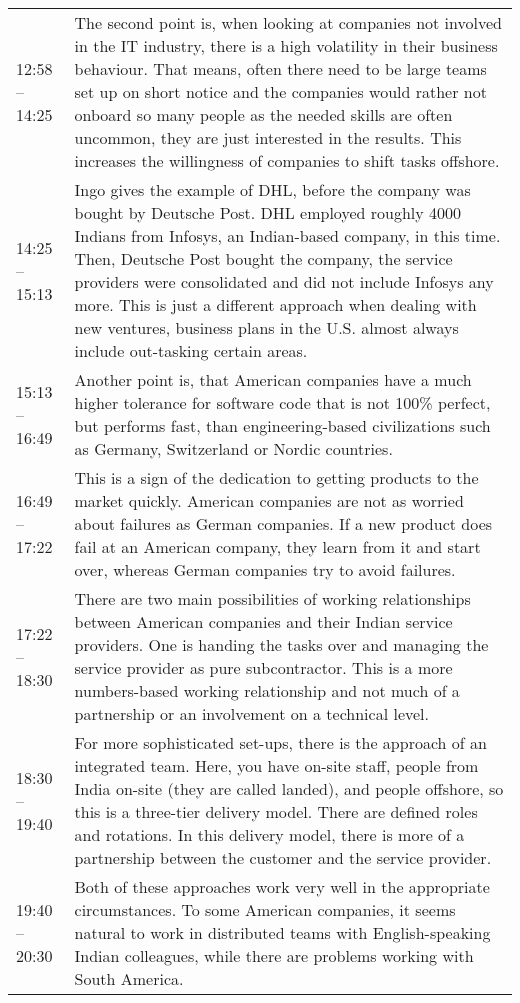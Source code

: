 \begin{appendix}
\begin{longtable}{l p{12.5cm}}
	12:58 -- 14:25& The second point is, when looking at companies not involved in the IT industry, there is a high volatility in their business behaviour. That means, often there need to be large teams set up on short notice and the companies would rather not onboard so many people as the needed skills are often uncommon, they are just interested in the results. This increases the willingness of companies to shift tasks offshore.\\
	14:25 -- 15:13&Ingo gives the example of DHL, before the company was bought by Deutsche Post. DHL employed roughly 4000 Indians from Infosys, an Indian-based company, in this time. Then, Deutsche Post bought the company, the service providers were consolidated and did not include Infosys any more. This is just a different approach when dealing with new ventures, business plans in the U.S. almost always include out-tasking certain areas.\\
	15:13 -- 16:49&Another point is, that American companies have a much higher tolerance for software code that is not 100\% perfect, but performs fast, than engineering-based civilizations such as Germany, Switzerland or Nordic countries.\\
	16:49 -- 17:22& This is a sign of the dedication to getting products to the market quickly. American companies are not as worried about failures as German companies. If a new product does fail at an American company, they learn from it and start over, whereas German companies try to avoid failures.\\
	17:22 -- 18:30& There are two main possibilities of working relationships between American companies and their Indian service providers. One is handing the tasks over and managing the service provider as pure subcontractor. This is a more numbers-based working relationship and not much of a partnership or an involvement on a technical level.\\
	18:30 -- 19:40& For more sophisticated set-ups, there is the approach of an integrated team. Here, you have on-site staff, people from India on-site (they are called landed), and people offshore, so this is a three-tier delivery model. There are defined roles and rotations. In this delivery model, there is more of a partnership between the customer and the service provider.\\
	19:40 -- 20:30& Both of these approaches work very well in the appropriate circumstances. To some American companies, it seems natural to work in distributed teams with English-speaking Indian colleagues, while there are problems working with South America.\\

\end{longtable}
\end{appendix}
